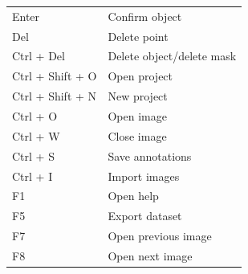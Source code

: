 \documentclass[a4paper, 11pt]{article}
\begin{document}
\begin{tabular}{ll}
	Enter & Confirm object\\
	Del & Delete point\\
	Ctrl + Del & Delete object/delete mask\\
	Ctrl + Shift + O & Open project\\
	Ctrl + Shift + N & New project\\
	Ctrl + O & Open image\\  
	Ctrl + W & Close image\\  
	Ctrl + S & Save annotations\\ 
	Ctrl + I & Import images\\
	F1 & Open help\\ 
	F5 & Export dataset\\ 
	F7 & Open previous image\\ 
	F8 & Open next image\\  
\end{tabular}
\end{document}
